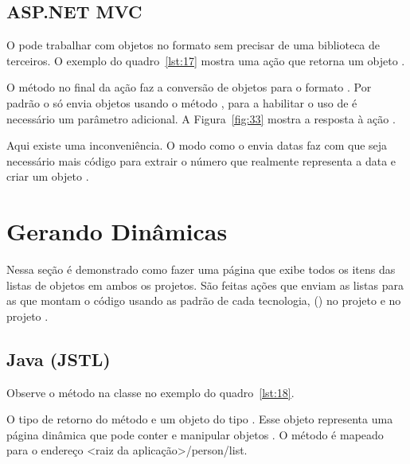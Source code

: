 \subsection{ASP.NET MVC}

O  pode trabalhar com objetos no formato  sem precisar de uma biblioteca de terceiros. O exemplo do quadro~\ref{lst:17} mostra uma ação que retorna um objeto .


O método  no final da ação faz a conversão de objetos para o formato . Por padrão o  só envia objetos  usando o método , para a habilitar o uso de  é necessário um parâmetro adicional. A Figura~\ref{fig:33} mostra a resposta à ação .


Aqui existe uma inconveniência. O modo como o  envia datas faz com que seja necessário mais código  para extrair o número que realmente representa a data e criar um objeto .

\section{Gerando  Dinâmicas}

Nessa seção é demonstrado como fazer uma página que exibe todos os itens das listas de objetos  em ambos os projetos. São feitas ações que enviam as listas para as  que montam o código  usando as  padrão de cada tecnologia,  () no projeto  e  no projeto .

\subsection{Java (JSTL)}

Observe o método  na classe  no exemplo do quadro~\ref{lst:18}.


O tipo de retorno do método  e um objeto do tipo . Esse objeto representa uma página dinâmica que pode conter e manipular objetos . O método é mapeado para o endereço <raiz da aplicação>/person/list. 

